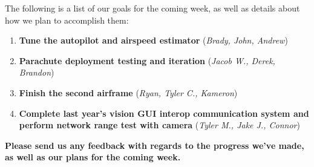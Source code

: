 \documentclass[]{../auvsi_doc}
\begin{document}
The following is a list of our goals for the coming week, as well as details about how we plan to accomplish them:

\begin{enumerate}
	\item \textbf{Tune the autopilot and airspeed estimator} (\textit{Brady, John, Andrew})
	\item \textbf{Parachute deployment testing and iteration} (\textit{Jacob W., Derek, Brandon})
	\item \textbf{Finish the second airframe} (\textit{Ryan, Tyler C., Kameron})
	\item \textbf{Complete last year's vision GUI interop communication system and perform network range test with camera} (\textit{Tyler M., Jake J., Connor})
\end{enumerate}

\textbf{Please send us any feedback with regards to the progress we've made, as well as our plans for the coming week.}

%
%
%
\end{document}
